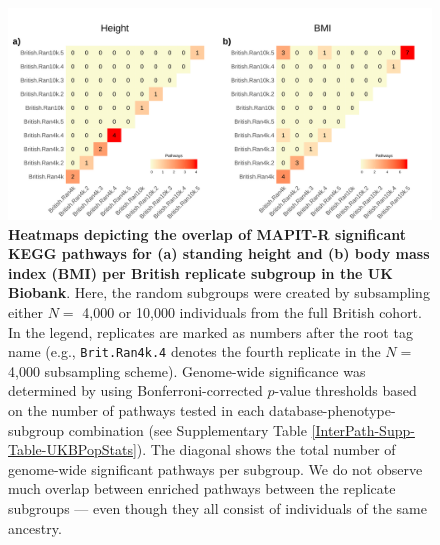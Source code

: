\documentclass[10pt]{article}
\begin{document}
\begin{landscape}
\begin{figure}[htbp]
\centering
\includegraphics[scale=.2]{Images/Supp/InterPath_Supp_Figure_BritReps_Heatplots_KEGG_vs4.png}
\caption{\textbf{Heatmaps depicting the overlap of MAPIT-R significant KEGG pathways for (a) standing height and (b) body mass index (BMI) per British replicate subgroup in the UK Biobank}. Here, the random subgroups were created by subsampling either $N =$ 4,000 or 10,000 individuals from the full British cohort. In the legend, replicates are marked as numbers after the root tag name (e.g., \texttt{Brit.Ran4k.4} denotes the fourth replicate in the $N =$ 4,000 subsampling scheme). Genome-wide significance was determined by using Bonferroni-corrected $p$-value thresholds based on the number of pathways tested in each database-phenotype-subgroup combination (see Supplementary Table \ref{InterPath-Supp-Table-UKBPopStats}). The diagonal shows the total number of genome-wide significant pathways per subgroup. We do not observe much overlap between enriched pathways between the replicate subgroups --- even though they all consist of individuals of the same ancestry.}
\label{InterPath-Supp-Figure-BritReps-Heatplots-AllPaths-KEGG}
\end{figure}
\clearpage
\end{landscape}
\end{document}
